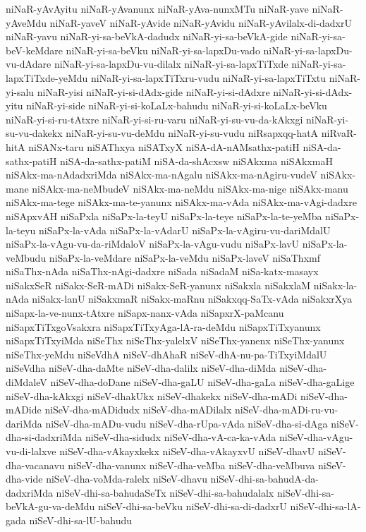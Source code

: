 {niNaR-yAvAyitu
niNaR-yAvanunx
niNaR-yAva-nunxMTu
niNaR-yave
niNaR-yAveMdu
niNaR-yaveV
niNaR-yAvide
niNaR-yAvidu
niNaR-yAvilalx-di-dadxrU
niNaR-yavu
niNaR-yi-sa-beVkA-dadudx
niNaR-yi-sa-beVkA-gide
niNaR-yi-sa-beV-keMdare
niNaR-yi-sa-beVku
niNaR-yi-sa-lapxDu-vado
niNaR-yi-sa-lapxDu-vu-dAdare
niNaR-yi-sa-lapxDu-vu-dilalx
niNaR-yi-sa-lapxTiTxde
niNaR-yi-sa-lapxTiTxde-yeMdu
niNaR-yi-sa-lapxTiTxru-vudu
niNaR-yi-sa-lapxTiTxtu
niNaR-yi-salu
niNaR-yisi
niNaR-yi-si-dAdx-gide
niNaR-yi-si-dAdxre
niNaR-yi-si-dAdx-yitu
niNaR-yi-side
niNaR-yi-si-koLaLx-bahudu
niNaR-yi-si-koLaLx-beVku
niNaR-yi-si-ru-tAtxre
niNaR-yi-si-ru-varu
niNaR-yi-su-vu-da-kAkxgi
niNaR-yi-su-vu-dakekx
niNaR-yi-su-vu-deMdu
niNaR-yi-su-vudu
niRsapxqq-hatA
niRvaR-hitA
niSANx-taru
niSAThxya
niSATxyX
niSA-dA-nAMsathx-patiH
niSA-da-sathx-patiH
niSA-da-sathx-patiM
niSA-da-shAcxsw
niSAkxma
niSAkxmaH
niSAkx-ma-nAdadxriMda
niSAkx-ma-nAgalu
niSAkx-ma-nAgiru-vudeV
niSAkx-mane
niSAkx-ma-neMbudeV
niSAkx-ma-neMdu
niSAkx-ma-nige
niSAkx-manu
niSAkx-ma-tege
niSAkx-ma-te-yanunx
niSAkx-ma-vAda
niSAkx-ma-vAgi-dadxre
niSApxvAH
niSaPxla
niSaPx-la-teyU
niSaPx-la-teye
niSaPx-la-te-yeMba
niSaPx-la-teyu
niSaPx-la-vAda
niSaPx-la-vAdarU
niSaPx-la-vAgiru-vu-dariMdalU
niSaPx-la-vAgu-vu-da-riMdaloV
niSaPx-la-vAgu-vudu
niSaPx-lavU
niSaPx-la-veMbudu
niSaPx-la-veMdare
niSaPx-la-veMdu
niSaPx-laveV
niSaThxmf
niSaThx-nAda
niSaThx-nAgi-dadxre
niSada
niSadaM
niSa-katx-masayx
niSakxSeR
niSakx-SeR-mADi
niSakx-SeR-yanunx
niSakxla
niSakxlaM
niSakx-la-nAda
niSakx-lanU
niSakxmaR
niSakx-maRnu
niSakxqq-SaTx-vAda
niSakxrXya
niSapx-la-ve-nunx-tAtxre
niSapx-nanx-vAda
niSapxrX-paMcanu
niSapxTiTxgoVsakxra
niSapxTiTxyAga-lA-ra-deMdu
niSapxTiTxyanunx
niSapxTiTxyiMda
niSeThx
niSeThx-yalelxV
niSeThx-yanenx
niSeThx-yanunx
niSeThx-yeMdu
niSeVdhA
niSeV-dhAhaR
niSeV-dhA-nu-pa-TiTxyiMdalU
niSeVdha
niSeV-dha-daMte
niSeV-dha-dalilx
niSeV-dha-diMda
niSeV-dha-diMdaleV
niSeV-dha-doDane
niSeV-dha-gaLU
niSeV-dha-gaLa
niSeV-dha-gaLige
niSeV-dha-kAkxgi
niSeV-dhakUkx
niSeV-dhakekx
niSeV-dha-mADi
niSeV-dha-mADide
niSeV-dha-mADidudx
niSeV-dha-mADilalx
niSeV-dha-mADi-ru-vu-dariMda
niSeV-dha-mADu-vudu
niSeV-dha-rUpa-vAda
niSeV-dha-si-dAga
niSeV-dha-si-dadxriMda
niSeV-dha-sidudx
niSeV-dha-vA-ca-ka-vAda
niSeV-dha-vAgu-vu-di-lalxve
niSeV-dha-vAkayxkekx
niSeV-dha-vAkayxvU
niSeV-dhavU
niSeV-dha-vacanavu
niSeV-dha-vanunx
niSeV-dha-veMba
niSeV-dha-veMbuva
niSeV-dha-vide
niSeV-dha-voMda-ralelx
niSeV-dhavu
niSeV-dhi-sa-bahudA-da-dadxriMda
niSeV-dhi-sa-bahudaSeTx
niSeV-dhi-sa-bahudalalx
niSeV-dhi-sa-beVkA-gu-va-deMdu
niSeV-dhi-sa-beVku
niSeV-dhi-sa-di-dadxrU
niSeV-dhi-sa-lA-gada
niSeV-dhi-sa-lU-bahudu
}
